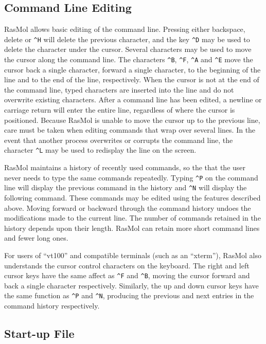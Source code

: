 \subsection{Command Line Editing}
\label{Editing}
RasMol allows basic editing of the command line. Pressing either backspace,
delete or \verb"^H" will delete the previous character, and the key \verb"^D"
may be used to delete the character under the cursor. Several characters
may be used to move the cursor along the command line. The characters
\verb"^B", \verb"^F", \verb"^A" and \verb"^E" move the cursor back a single
character, forward a single character, to the beginning of the line and to
the end of the line, respectively. When the cursor is not at the end of the
command line, typed characters are inserted into the line and do not 
overwrite existing characters. After a command line has been edited, a 
newline or carriage return will enter the entire line, regardless of where
the cursor is positioned. Because RasMol is unable to move the cursor up to 
the previous line, care must be taken when editing commands that wrap over
several lines. In the event that another process overwrites or corrupts the 
command line, the character \verb"^L" may be used to redisplay the line on 
the screen.

RasMol maintains a history of recently used commands, so the that the user
never needs to type the same commands repeatedly. Typing \verb"^P" on the 
command line will display the previous command in the history and \verb"^N" 
will display the following command. These commands may be edited
using the features described above. Moving forward or backward through
the command history undoes the modifications made to the current line. The
number of commands retained in the history depends upon their length.
RasMol can retain more short command lines and fewer long ones.

For users of ``vt100'' and compatible terminals (such as an ``xterm''), RasMol
also understands the cursor control characters on the keyboard. The right 
and left cursor keys have the same affect as \verb"^F" and \verb"^B", moving
the cursor forward and back a single character respectively. Similarly, the
up and down cursor keys have the same function as \verb"^P" and \verb"^N",
producing the previous and next entries in the command history respectively.


\subsection{Start-up File}

